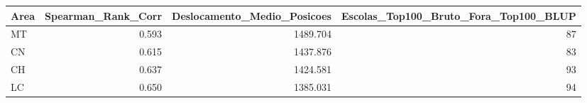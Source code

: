 \begin{tabular}{lrrr}
\toprule
Area & Spearman_Rank_Corr & Deslocamento_Medio_Posicoes & Escolas_Top100_Bruto_Fora_Top100_BLUP \\
\midrule
MT & 0.593 & 1489.704 & 87 \\
CN & 0.615 & 1437.876 & 83 \\
CH & 0.637 & 1424.581 & 93 \\
LC & 0.650 & 1385.031 & 94 \\
\bottomrule
\end{tabular}
